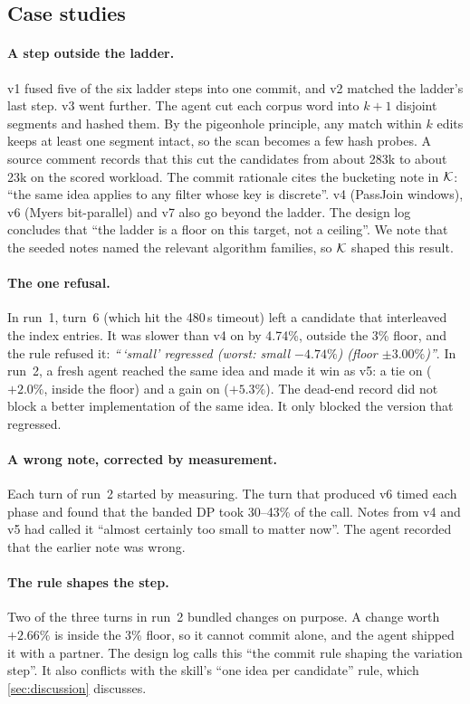 \subsection{Case studies}

\paragraph{A step outside the ladder.} v1 fused five of the six ladder steps into one commit, and v2
matched the ladder's last step. v3 went further. The agent cut each corpus word into $k+1$ disjoint
segments and hashed them. By the pigeonhole principle, any match within $k$ edits keeps at least one
segment intact, so the scan becomes a few hash probes. A source comment records that this cut the
candidates from about 283k to about 23k on the scored workload. The commit rationale cites the
bucketing note in $\mathcal{K}$: ``the same idea applies to any filter whose key is discrete''. v4 (PassJoin
windows), v6 (Myers bit-parallel) and v7 also go beyond the ladder. The design log concludes that
``the ladder is a floor on this target, not a ceiling''. We note that the seeded notes named the
relevant algorithm families, so $\mathcal{K}$ shaped this result.

\paragraph{The one refusal.} In run~1, turn~6 (which hit the 480\,s timeout) left a candidate that
interleaved the index entries. It was slower than v4 on  by 4.74\%, outside the 3\%
floor, and the rule refused it: \emph{``\,`small' regressed (worst: small $-4.74\%$) (floor
$\pm3.00\%$)''}. In run~2, a fresh agent reached the same idea and made it win as v5: a tie on
 ($+2.0\%$, inside the floor) and a gain on  ($+5.3\%$). The dead-end record
did not block a better implementation of the same idea. It only blocked the version that
regressed.

\paragraph{A wrong note, corrected by measurement.} Each turn of run~2 started by measuring. The
turn that produced v6 timed each phase and found that the banded DP took 30--43\% of the call. Notes
from v4 and v5 had called it ``almost certainly too small to matter now''. The agent recorded that
the earlier note was wrong.

\paragraph{The rule shapes the step.} Two of the three turns in run~2 bundled changes on purpose. A
change worth $+2.66\%$ is inside the 3\% floor, so it cannot commit alone, and the agent shipped it
with a partner. The design log calls this ``the commit rule shaping the variation step''. It also
conflicts with the skill's ``one idea per candidate'' rule, which \cref{sec:discussion} discusses.

